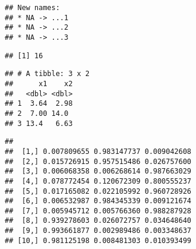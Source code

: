 \documentclass[
]{book}
\newenvironment{Shaded}{\begin{snugshade}}{\end{snugshade}}
\newcommand{\DecValTok}[1]{\textcolor[rgb]{0.00,0.00,0.81}{#1}}
\newcommand{\FunctionTok}[1]{\textcolor[rgb]{0.00,0.00,0.00}{#1}}
\newcommand{\NormalTok}[1]{#1}
\newcommand{\SpecialCharTok}[1]{\textcolor[rgb]{0.00,0.00,0.00}{#1}}
\begin{document}
\begin{verbatim}
## New names:
## * NA -> ...1
## * NA -> ...2
## * NA -> ...3
\end{verbatim}

\begin{Shaded}
\end{Shaded}

\begin{verbatim}
## [1] 16
\end{verbatim}

\begin{Shaded}
\end{Shaded}

\begin{verbatim}
## # A tibble: 3 x 2
##      x1    x2
##   <dbl> <dbl>
## 1  3.64  2.98
## 2  7.00 14.0 
## 3 13.4   6.63
\end{verbatim}

\begin{Shaded}
\end{Shaded}

\begin{verbatim}
##                                          
##  [1,] 0.007809655 0.983147737 0.009042608
##  [2,] 0.015726915 0.957515486 0.026757600
##  [3,] 0.006068358 0.006268614 0.987663029
##  [4,] 0.078772454 0.120672309 0.800555237
##  [5,] 0.017165082 0.022105992 0.960728926
##  [6,] 0.006532987 0.984345339 0.009121674
##  [7,] 0.005945712 0.005766360 0.988287928
##  [8,] 0.939278603 0.026072757 0.034648640
##  [9,] 0.993661877 0.002989486 0.003348637
## [10,] 0.981125198 0.008481303 0.010393499
\end{verbatim}

\begin{Shaded}
\end{Shaded}
\end{document}
